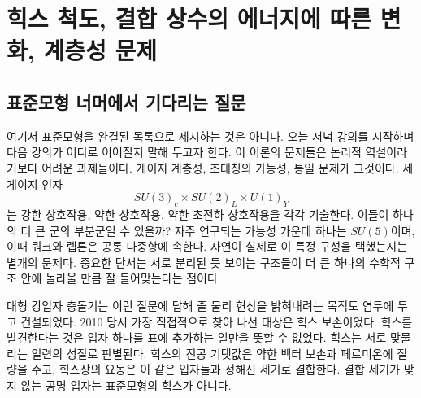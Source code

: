 \chapter{힉스 척도, 결합 상수의 에너지에 따른 변화, 계층성 문제}


\section{표준모형 너머에서 기다리는 질문}

여기서 표준모형을 완결된 목록으로 제시하는 것은 아니다. 오늘 저녁 강의를 시작하며 다음 강의가 어디로 이어질지 말해 두고자 한다. 이 이론의 문제들은 논리적 역설이라기보다 어려운 과제들이다. 게이지 계층성, 초대칭의 가능성, 통일 문제가 그것이다. 세 게이지 인자
\begin{equation}
  SU(3)_c\times SU(2)_L\times U(1)_Y
  \label{eq:l10-standard-model-group}
\end{equation}
는 강한 상호작용, 약한 상호작용, 약한 초전하 상호작용을 각각 기술한다. 이들이 하나의 더 큰 군의 부분군일 수 있을까? 자주 연구되는 가능성 가운데 하나는
\(SU(5)\)이며, 이때 쿼크와 렙톤은 공통 다중항에 속한다. 자연이 실제로 이 특정 구성을 택했는지는 별개의 문제다. 중요한 단서는 서로 분리된 듯 보이는 구조들이 더 큰 하나의 수학적 구조 안에 놀라울 만큼 잘 들어맞는다는 점이다.

대형 강입자 충돌기는 이런 질문에 답해 줄 물리 현상을 밝혀내려는 목적도 염두에 두고 건설되었다. 2010 당시 가장 직접적으로 찾아 나선 대상은 힉스 보손이었다. 힉스를 발견한다는 것은 입자 하나를 표에 추가하는 일만을 뜻할 수 없었다. 힉스는 서로 맞물리는 일련의 성질로 판별된다. 힉스의 진공 기댓값은 약한 벡터 보손과 페르미온에 질량을 주고, 힉스장의 요동은 이 같은 입자들과 정해진 세기로 결합한다. 결합 세기가 맞지 않는 공명 입자는 표준모형의 힉스가 아니다.

